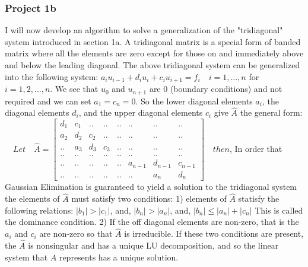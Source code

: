 \documentclass[11pt, oneside]{article}   	%
\begin{document}
\subsubsection{Project 1b}
I will now develop an algorithm to solve a generalization of the "tridiagonal" system introduced in section 1a. A tridiagonal matrix is a special form of banded matrix where all the elements are zero except for those on and immediately above and below the leading diagonal. The above tridiagonal system can be generalized into the following system:\newline
\newline 
$a_iu_{i-1}+d_iu_i+c_iu_{i+1}=f_i\quad i=1,...,n$\newline
\newline
for $i=1,2,...,n$. We see that $u_0$ and $u_{n+1}$ are 0 (boundary conditions) and not required and we can set $a_1=c_n=0$. So  the lower diagonal elements $a_i$, the diagonal elements $d_i$, and the upper diagonal elements $c_i$ give $\hat{A}$ the general form:\newline
\newline
$\quad Let \quad \hat{A} = \begin{bmatrix}
d_1 & c_1 & ..& ..& ..& ..& ..& ..\\
a_2 & d_2 & c_2 & .. & ..& ..& ..& ..\\
.. & a_3 & d_3 & c_3 & .. & .. & .. & ..\\
.. & .. & .. & .. & .. & .. & .. & ..\\
.. & .. & .. & .. & .. & a_{n-1} & d_{n-1} & c_{n-1}\\
.. & .. & .. & .. & .. & .. & a_n & d_n
\end{bmatrix}\quad then$,\newline
\newline
In order that Gaussian Elimination is guaranteed to yield a solution to the tridiagonal system the elements of $\hat{A}$ must satisfy two conditions: 1) elements of $\hat{A}$ statisfy the following relations:
\newline
$|b_1|>|c_1|$, and, $|b_n|>|a_n|$, and, $|b_n| \le |a_n|+|c_n|$\newline
This is called the dominance condition. 2) If the off diagonal elements are non-zero, that is the $a_i$ and $c_i$ are non-zero so that $\hat{A}$ is irreducible. If these two conditions are present, the $\hat{A}$ is nonsingular and has a unique LU decomposition, and so the linear system that $\hat{A}$ represents has a unique solution.\newline
\newline
\end{document}
